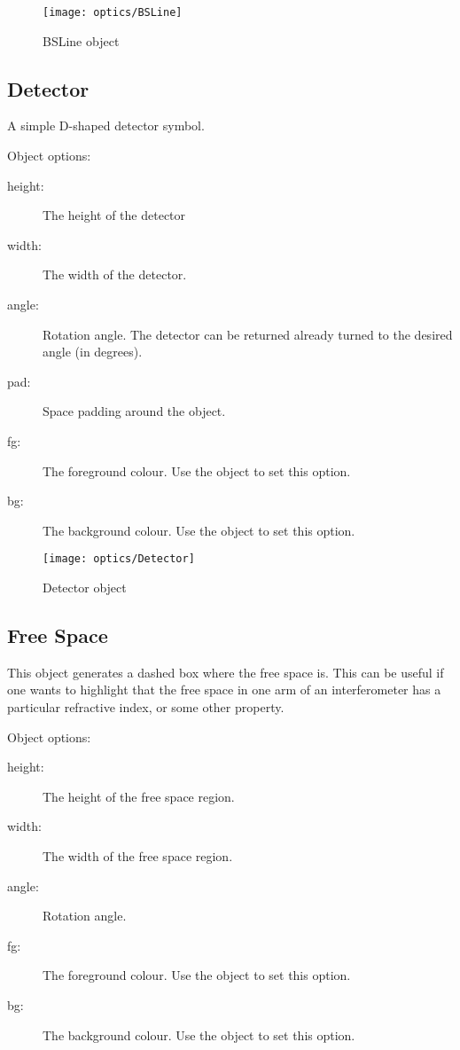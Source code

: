 \begin{figure}[!ht]
\centerline{\texttt{[image: optics/BSLine]}}
\caption{BSLine object}
\label{fig:bsline}
\end{figure}

\subsection{Detector}

A simple D-shaped detector symbol.

Object options:
\begin{description}
\item[height:] The height of the detector
\item[width:] The width of the detector.
\item[angle:] Rotation angle.  The detector can be returned already
turned to the desired angle (in degrees).
\item[pad:] Space padding around the object.
\item[fg:] The foreground colour.  Use the  object to set this
option.
\item[bg:] The background colour.  Use the  object to set this
option.
\end{description}

\begin{figure}[!ht]
\centerline{\texttt{[image: optics/Detector]}}
\caption{Detector object}
\label{fig:detector}
\end{figure}

\subsection{Free Space}

This object generates a dashed box where the free space is.  This can be
useful if one wants to highlight that the free space in one arm of an
interferometer has a particular refractive index, or some other property.

Object options:
\begin{description}
\item[height:] The height of the free space region.
\item[width:] The width of the free space region.
\item[angle:] Rotation angle.  
\item[fg:] The foreground colour.  Use the  object to set this
option.
\item[bg:] The background colour.  Use the  object to set this
option.
\end{description}

